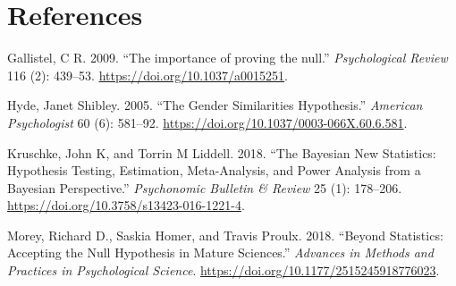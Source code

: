 \documentclass[
  letterpaper,
  DIV=11,
  numbers=noendperiod]{scrartcl}
\newlength{\cslhangindent}
\newlength{\cslentryspacingunit} %
\newenvironment{CSLReferences}[2] %
 {%
  \setlength{\parindent}{0pt}
  \ifodd #1
  \let\oldpar\par
  \def\par{\hangindent=\cslhangindent\oldpar}
  \fi
  \setlength{\parskip}{#2\cslentryspacingunit}
 }%
 {}
\begin{document}
\hypertarget{references}{%
\section*{References}\label{references}}

\hypertarget{refs}{}
\begin{CSLReferences}{1}{0}
\leavevmode{}%
Gallistel, C R. 2009. {``{The importance of proving the null}.''}
\emph{Psychological Review} 116 (2): 439--53.
\url{https://doi.org/10.1037/a0015251}.

\leavevmode{}%
Hyde, Janet Shibley. 2005. {``The Gender Similarities Hypothesis.''}
\emph{American Psychologist} 60 (6): 581--92.
\url{https://doi.org/10.1037/0003-066X.60.6.581}.

\leavevmode{}%
Kruschke, John K, and Torrin M Liddell. 2018. {``The Bayesian New
Statistics: Hypothesis Testing, Estimation, Meta-Analysis, and Power
Analysis from a Bayesian Perspective.''} \emph{Psychonomic Bulletin {\&}
Review} 25 (1): 178--206.
\url{https://doi.org/10.3758/s13423-016-1221-4}.

\leavevmode{}%
Morey, Richard D., Saskia Homer, and Travis Proulx. 2018. {``Beyond
Statistics: Accepting the Null Hypothesis in Mature Sciences.''}
\emph{Advances in Methods and Practices in Psychological Science}.
\url{https://doi.org/10.1177/2515245918776023}.

\end{CSLReferences}
\end{document}
